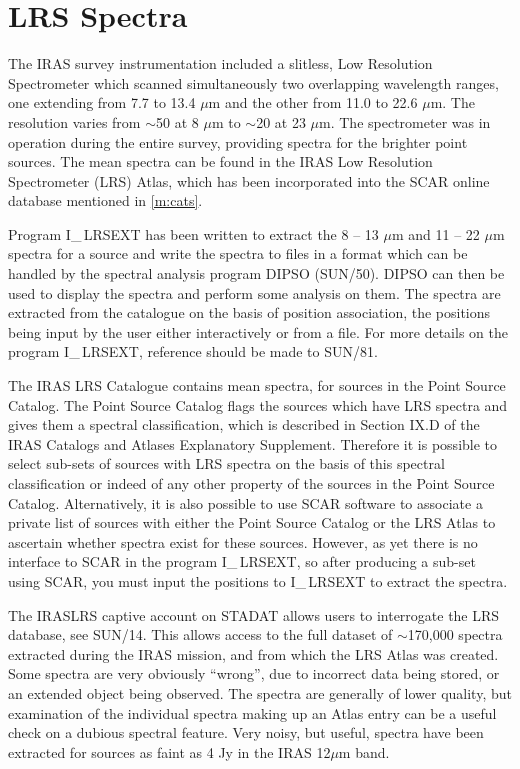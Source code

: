 \section{LRS Spectra}
The IRAS survey instrumentation included a slitless, Low Resolution
Spectrometer which scanned simultaneously two overlapping wavelength ranges,
one extending from 7.7 to 13.4 $\mu$m and the other from 11.0 to 22.6 $\mu$m.
The resolution varies from $\sim$50 at 8 $\mu$m to $\sim$20 at 23 $\mu$m.
The spectrometer was in operation during the entire survey, providing spectra
for the brighter point sources.
The mean spectra can be found in the IRAS Low Resolution Spectrometer (LRS)
Atlas, which has been incorporated into the SCAR online database mentioned
in \ref{m:cats}.

Program I\_$\,$LRSEXT has been written to extract the 8 -- 13 $\mu$m and
11 -- 22 $\mu$m spectra for a source and write the spectra to files in a
format which can be handled by the spectral analysis program DIPSO (SUN/50).
DIPSO can then be used to display the spectra and perform some analysis on them.
The spectra are extracted from the catalogue on the basis of position
association, the positions being input by the user either interactively or from
a file.
For more details on the program I\_$\,$LRSEXT, reference should be made to
SUN/81.

The IRAS LRS Catalogue contains mean spectra, for sources in the Point
Source Catalog.
The Point Source Catalog flags the sources which have LRS spectra and gives
them a spectral classification, which is described in Section IX.D of the IRAS
Catalogs and Atlases Explanatory Supplement.
Therefore it is possible to select sub-sets of sources with LRS spectra on the
basis of this spectral classification or indeed of any other property of the
sources in the Point Source Catalog.
Alternatively, it is also possible to use SCAR software to associate a private
list of sources with either the Point Source Catalog or the LRS Atlas to
ascertain whether spectra exist for these sources.
However, as yet there is no interface to SCAR in the program I\_$\,$LRSEXT, so
after producing a sub-set using SCAR, you must input the positions to
I\_$\,$LRSEXT to extract the spectra.

The IRASLRS captive account on STADAT allows users to interrogate the LRS
database, see SUN/14.
This allows access to the full dataset of $\sim$170,000 spectra extracted
during the IRAS mission, and from which the LRS Atlas was created.
Some spectra are very obviously ``wrong'', due to incorrect data being stored,
or an extended object being observed.
The spectra are generally of lower quality, but examination of the individual
spectra making up an Atlas entry can be a useful check on a dubious spectral
feature.
Very noisy, but useful, spectra have been extracted for sources as faint as
4 Jy in the IRAS 12$\mu$m band.

